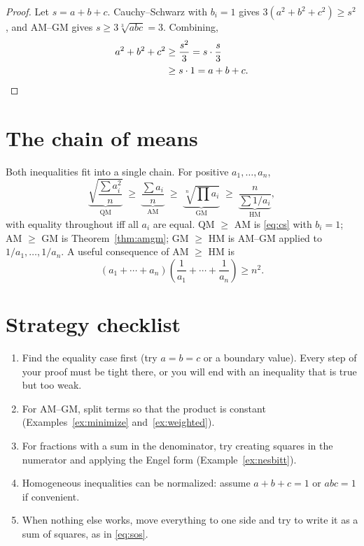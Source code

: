 \documentclass[11pt,a4paper]{article}
\theoremstyle{definition}
\theoremstyle{remark}
\begin{document}
\begin{proof}
Let $s = a + b + c$. Cauchy--Schwarz with $b_i = 1$ gives $3(a^2 + b^2 + c^2) \geq s^2$, and AM--GM gives $s \geq 3\sqrt[3]{abc} = 3$. Combining,
\begin{align*}
  a^2 + b^2 + c^2
    &\geq \frac{s^2}{3} = s \cdot \frac{s}{3} \\
    &\geq s \cdot 1 = a + b + c. \qedhere
\end{align*}
\end{proof}

\section{The chain of means}

Both inequalities fit into a single chain. For positive $a_1, \dots, a_n$,
\begin{equation}\label{eq:means}
  \underbrace{\sqrt{\frac{\sum a_i^2}{n}}}_{\text{QM}}
  \;\geq\; \underbrace{\frac{\sum a_i}{n}}_{\text{AM}}
  \;\geq\; \underbrace{\sqrt[n]{\textstyle\prod a_i}}_{\text{GM}}
  \;\geq\; \underbrace{\frac{n}{\sum 1/a_i}}_{\text{HM}},
\end{equation}
with equality throughout iff all $a_i$ are equal. QM $\geq$ AM is \eqref{eq:cs} with $b_i = 1$; AM $\geq$ GM is Theorem~\ref{thm:amgm}; GM $\geq$ HM is AM--GM applied to $1/a_1, \dots, 1/a_n$. A useful consequence of AM $\geq$ HM is
\[
  (a_1 + \cdots + a_n)\left(\frac{1}{a_1} + \cdots + \frac{1}{a_n}\right) \geq n^2.
\]

\section*{Strategy checklist}

\begin{enumerate}[label=\arabic*.]
  \item Find the equality case first (try $a = b = c$ or a boundary value). Every step of your proof must be tight there, or you will end with an inequality that is true but too weak.
  \item For AM--GM, split terms so that the product is constant (Examples~\ref{ex:minimize} and~\ref{ex:weighted}).
  \item For fractions with a sum in the denominator, try creating squares in the numerator and applying the Engel form (Example~\ref{ex:nesbitt}).
  \item Homogeneous inequalities can be normalized: assume $a + b + c = 1$ or $abc = 1$ if convenient.
  \item When nothing else works, move everything to one side and try to write it as a sum of squares, as in \eqref{eq:sos}.
\end{enumerate}
\end{document}

